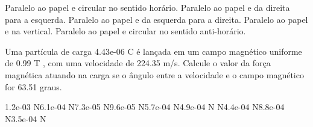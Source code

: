 \documentclass[12pt, addpoints]{exam}
\begin{document}
\begin{questions}
\begin{multicols*}{2}
\begin{choices}
\choice Paralelo ao papel e circular no sentido horário. 
\choice Paralelo ao papel e da direita para a esquerda. 
\choice Paralelo ao papel e da esquerda para a direita. 
\choice Paralelo ao papel e na vertical. 
\choice Paralelo ao papel e circular no sentido anti-horário. 
\end{choices}
\question Uma partícula de carga 4.43e-06 C é lançada em um campo magnético uniforme de    0.99 T , com uma velocidade de 224.35 m/s. Calcule o valor da força magnética atuando na carga se o ângulo entre a velocidade e o campo magnético for   63.51 graus.

\begin{oneparchoices}
\choice 1.2e-03 N\choice 6.1e-04 N\choice 7.3e-05 N\choice 9.6e-05 N\choice 5.7e-04 N\choice 4.9e-04 N N\choice 4.4e-04 N\choice 8.8e-04 N\choice 3.5e-04 N
\end{oneparchoices}\end{multicols*}
\end{questions}
\newpage
\end{document}
